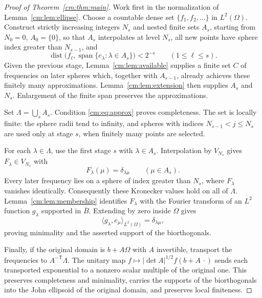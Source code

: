 \documentclass[a4paper,12pt,reqno]{amsart}
\theoremstyle{remark}
\numberwithin{equation}{section}
\DeclareMathOperator{\spanop}{span}
\DeclareMathOperator{\dist}{dist}
\begin{document}
\begin{proof}[Proof of Theorem~\ref{cm:thm:main}]
Work first in the normalization of Lemma~\ref{cm:lem:ellipse}.
Choose a countable dense set $\{f_1,f_2,\ldots\}$ in $L^2(\Omega)$.
Construct strictly increasing integers $N_s$ and nested finite sets
$A_s$, starting from $N_0=0$, $A_0=\{0\}$, so that $A_s$
interpolates at level $N_s$, all new points have sphere index greater
than $N_{s-1}$, and
\begin{equation}\label{cm:eq:approx}
 \dist\bigl(f_\ell,\spanop\{e_\lambda:\lambda\in A_s\}\bigr)
                   <2^{-s}\qquad(1\leq\ell\leq s).
\end{equation}
Given the previous stage, Lemma~\ref{cm:lem:available} supplies a
finite set $C$ of frequencies on later spheres which, together with
$A_{s-1}$, already achieves these finitely many approximations.
Lemma~\ref{cm:lem:extension} then supplies $A_s$ and $N_s$.
Enlargement of the finite span preserves the approximations.

Set $\Lambda=\bigcup_s A_s$. Condition \eqref{cm:eq:approx} proves
completeness. The set is locally finite: the sphere radii tend to
infinity, and spheres with indices $N_{s-1}<j\leq N_s$ are used
only at stage $s$, when finitely many points are selected.

For each $\lambda\in\Lambda$, use the first stage $s$ with
$\lambda\in A_s$. Interpolation by $V_{N_s}$ gives
$F_\lambda\in V_{N_s}$ with
\[
 F_\lambda(\mu)=\delta_{\lambda\mu}\qquad(\mu\in A_s).
\]
Every later frequency lies on a sphere of index greater than $N_s$,
where $F_\lambda$ vanishes identically. Consequently these Kronecker
values hold on all of $\Lambda$. Lemma~\ref{cm:lem:membership}
identifies $F_\lambda$ with the Fourier transform of an $L^2$
function $g_\lambda$ supported in $\overline B$. Extending by zero
inside $\Omega$ gives
\[
 \langle g_\lambda,e_\mu\rangle_{L^2(\Omega)}
                        =\delta_{\lambda\mu},
\]
proving minimality and the asserted support of the biorthogonals.

Finally, if the original domain is $b+A\Omega$ with $A$ invertible,
transport the frequencies to $A^{-\mathsf T}\Lambda$.
The unitary map $f\mapsto |\det A|^{1/2}f(b+A\,\cdot)$ sends
each transported exponential to a nonzero scalar multiple of the
original one. This preserves completeness and minimality, carries
the supports of the biorthogonals into the John ellipsoid of the original domain,
and preserves local finiteness.
\end{proof}
\end{document}

